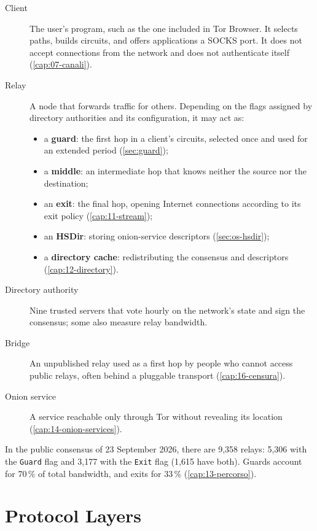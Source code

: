 \begin{description}
  \item[Client] The user's program, such as the one included in Tor Browser. It selects paths, builds circuits, and offers applications a SOCKS port. It does not accept connections from the network and does not authenticate itself (\cref{cap:07-canali}).
  \item[Relay] A node that forwards traffic for others. Depending on the flags assigned by directory authorities and its configuration, it may act as:
  \begin{itemize}
    \item a \textbf{guard}: the first hop in a client's circuits, selected once and used for an extended period (\cref{sec:guard});
    \item a \textbf{middle}: an intermediate hop that knows neither the source nor the destination;
    \item an \textbf{exit}: the final hop, opening Internet connections according to its exit policy (\cref{cap:11-stream});
    \item an \textbf{HSDir}: storing onion-service descriptors (\cref{sec:os-hsdir});
    \item a \textbf{directory cache}: redistributing the consensus and descriptors (\cref{cap:12-directory}).
  \end{itemize}
  \item[Directory authority] Nine trusted servers that vote hourly on the network's state and sign the consensus; some also measure relay bandwidth.
  \item[Bridge] An unpublished relay used as a first hop by people who cannot access public relays, often behind a pluggable transport (\cref{cap:16-censura}).
  \item[Onion service] A service reachable only through Tor without revealing its location (\cref{cap:14-onion-services}).
\end{description}

In the public consensus of 23 September 2026, there are 9,358 relays: 5,306 with the \texttt{Guard} flag and 3,177 with the \texttt{Exit} flag (1,615 have both). Guards account for 70\,\% of total bandwidth, and exits for 33\,\% (\cref{cap:13-percorso}).

\section{Protocol Layers}\label{sec:arch-livelli}

